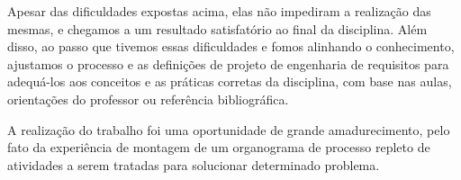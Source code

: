 \indent Apesar das dificuldades expostas acima, elas não impediram a realização das mesmas, e chegamos a um resultado satisfatório 
ao final da disciplina. Além disso, ao passo que tivemos essas dificuldades e fomos alinhando o conhecimento, ajustamos o processo 
e as definições de projeto de engenharia de requisitos para adequá-los aos conceitos e as práticas corretas da disciplina, com base 
nas aulas, orientações do professor ou referência bibliográfica.


\indent A realização do trabalho foi uma oportunidade de grande amadurecimento, pelo fato da experiência de montagem de um organograma 
de processo repleto de atividades a serem tratadas para solucionar determinado problema.